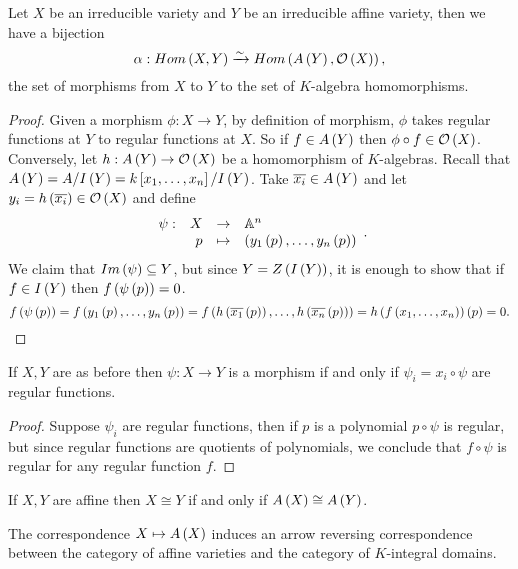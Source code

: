 \begin{proposition}
Let $ X $ be an irreducible variety and $ Y $ be an irreducible affine variety, then we have a bijection
$$ \alpha : Hom\left( X, Y \right) \xrightarrow{\sim} Hom\left( A\left( Y \right), \mathcal{O}\left( X \right) \right), $$
the set of morphisms from $ X $ to $ Y $ to the set of $ K $-algebra homomorphisms.
\end{proposition}

\begin{proof}
Given a morphism $ \phi : X \to Y $, by definition of morphism, $ \phi $ takes regular functions at $ Y $ to regular functions at $ X $. So if $ f \in A\left( Y \right) $ then $ \phi \circ f \in \mathcal{O}\left( X \right) $. Conversely, let $ h : A\left( Y \right) \to \mathcal{O}\left( X \right) $ be a homomorphism of $ K $-algebras. Recall that $ A\left( Y \right) = A / I\left( Y \right) = k\left[ x_1, \dots, x_n \right] / I\left( Y \right) $. Take $ \overline{x_i} \in A\left( Y \right) $ and let $ y_i = h\left( \overline{x_i} \right) \in \mathcal{O}\left( X \right) $ and define
$$ \function[\psi]{X}{\A^n}{p}{\rb{y_1\rb{p}, \dots, y_n\rb{p}}}. $$
We claim that $ Im\left( \psi \right) \subseteq Y $, but since $ Y = Z\left( I\left( Y \right) \right) $, it is enough to show that if $ f \in I\left( Y \right) $ then $ f\left( \psi\left( p \right) \right) = 0 $.
$$ f\left( \psi\left( p \right) \right) = f\left( y_1\left( p \right), \dots, y_n\left( p \right) \right) = f\left( h\left( \overline{x_1}\left( p \right) \right), \dots, h\left( \overline{x_n}\left( p \right) \right) \right) = h\left( f\left( x_1, \dots, x_n \right) \right)\left( p \right) = 0. $$
\end{proof}

\begin{lemma}
If $ X, Y $ are as before then $ \psi : X \to Y $ is a morphism if and only if $ \psi_i = x_i \circ \psi $ are regular functions.
\end{lemma}

\begin{proof}
Suppose $ \psi_i $ are regular functions, then if $ p $ is a polynomial $ p \circ \psi $ is regular, but since regular functions are quotients of polynomials, we conclude that $ f \circ \psi $ is regular for any regular function $ f $.
\end{proof}

\begin{corollary}
If $ X, Y $ are affine then $ X \cong Y $ if and only if $ A\left( X \right) \cong A\left( Y \right) $.
\end{corollary}

\begin{corollary}
The correspondence $ X \mapsto A\left( X \right) $ induces an arrow reversing correspondence between the category of affine varieties and the category of $ K $-integral domains.
\end{corollary}

